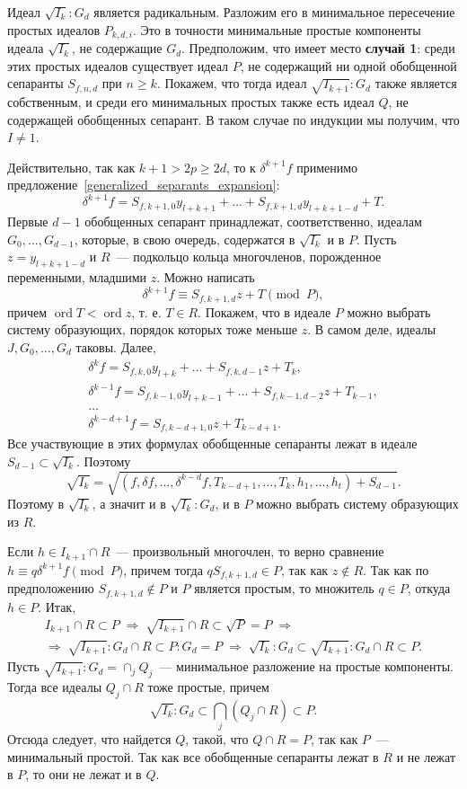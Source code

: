 \documentclass[11pt]{article}
\DeclareMathOperator{\ord}{ord}
\renewcommand{\ge}{\geqslant}
\theoremstyle{plain}
\theoremstyle{definition}
\theoremstyle{remark}
\begin{document}
Идеал $\sqrt{I_k} : G_d$ является радикальным. Разложим его в минимальное пересечение простых идеалов $P_{k,d,i}$.
Это в точности минимальные простые компоненты идеала $\sqrt{I_k}$, не содержащие $G_d$.
Предположим, что имеет место {\bf случай 1}: среди этих простых идеалов существует идеал $P$, не содержащий ни одной обобщенной сепаранты $S_{f,n,d}$
при $n \ge k$.
Покажем, что тогда идеал $\sqrt{I_{k+1}}:G_d$ также является собственным, и среди его минимальных простых также есть идеал $Q$,
не содержащей обобщенных сепарант. В таком случае по индукции мы получим, что $I \ne 1$.

Действительно, так как $k+1 > 2p \ge 2d$, то к $\delta^{k+1} f$ применимо предложение~\ref{generalized_separants_expansion}:
$$
 \delta^{k+1} f = S_{f,k+1,0} y_{l+k+1} + \ldots + S_{f,k+1,d} y_{l+k+1-d} + T.
$$
Первые $d-1$ обобщенных сепарант принадлежат, соответственно, идеалам $G_0, \ldots, G_{d-1}$,
которые, в свою очередь, содержатся в $\sqrt{I_k}$ и в $P$.
Пусть $z = y_{l+k+1-d}$
и $R$~--- подкольцо кольца многочленов, порожденное переменными, младшими $z$. 
Можно написать
$$
 \delta^{k+1} f \equiv S_{f,k+1,d} z + T \pmod P,
$$
причем $\ord T < \ord z$, т. е. $T \in R$.
Покажем, что в идеале $P$ можно выбрать систему образующих, порядок которых тоже меньше $z$.
В самом деле, идеалы $J, G_0, \ldots, G_d$ таковы. Далее,
\begin{gather*}
 \delta^k f = S_{f,k,0} y_{l+k} + \ldots + S_{f,k,d-1} z + T_k,\\
 \delta^{k-1} f = S_{f,k-1,0} y_{l+k-1} + \ldots + S_{f,k-1,d-2} z + T_{k-1},\\
 \ldots\\
 \delta^{k-d+1} f = S_{f,k-d+1,0} z + T_{k-d+1}.
\end{gather*}
Все участвующие в этих формулах обобщенные сепаранты лежат в идеале $S_{d-1} \subset \sqrt{I_k}$.
Поэтому
$$
 \sqrt{I_k} = \sqrt{(f, \delta f, \ldots, \delta^{k-d} f, T_{k-d+1}, \ldots, T_k, h_1, \ldots, h_t) + S_{d-1}}.
$$
Поэтому в $\sqrt{I_k}$, а значит и в $\sqrt{I_k}:G_d$, и в $P$ можно выбрать систему образующих из $R$.

Если $h \in I_{k+1} \cap R$~--- произвольный многочлен, то верно сравнение
$h \equiv q \delta^{k+1} f \pmod P$, причем тогда $q S_{f,k+1,d} \in P$, так как $z \notin R$.
Так как по предположению $S_{f,k+1,d} \notin P$ и $P$ является простым, то множитель $q \in P$,
откуда $h \in P$. Итак,
\begin{gather*}
 I_{k+1} \cap R \subset P \; \Longrightarrow \; \sqrt{I_{k+1}} \cap R \subset \sqrt{P} = P \; \Longrightarrow \\
 \Longrightarrow \; \sqrt{I_{k+1}}:G_d \cap R \subset P:G_d = P \; \Longrightarrow \; \sqrt{I_k}:G_d \subset \sqrt{I_{k+1}}:G_d \cap R \subset P.
\end{gather*}
Пусть $\sqrt{I_{k+1}}:G_d = \cap_j Q_j$~--- минимальное разложение на простые компоненты.
Тогда все идеалы $Q_j \cap R$ тоже простые, причем
$$
 \sqrt{I_k}:G_d \subset \bigcap_j \left( Q_j \cap R \right) \subset P.
$$
Отсюда следует, что найдется $Q$, такой, что $Q \cap R = P$, так как $P$~--- минимальный простой.
Так как все обобщенные сепаранты лежат в $R$ и не лежат в $P$, то они не лежат и в $Q$.
\end{document}
